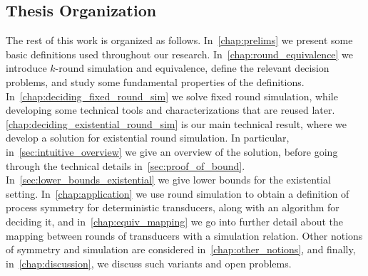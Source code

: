 \subsection*{Thesis Organization}
The rest of this work is organized as follows.
In~\cref{chap:prelims} we present some basic definitions used throughout our research. In~\cref{chap:round_equivalence} we introduce $k$-round simulation and equivalence, define the relevant decision problems, and study some fundamental properties of the definitions. In~\cref{chap:deciding_fixed_round_sim} we solve fixed round simulation, while developing some technical tools and characterizations that are reused later. \cref{chap:deciding_existential_round_sim} is our main technical result, where we develop a solution for existential round simulation. In particular, in~\cref{sec:intuitive_overview} we give an overview of the solution, before going through the technical details in~\cref{sec:proof_of_bound}. In~\cref{sec:lower_bounds_existential} we give lower bounds for the existential setting.
In~\cref{chap:application} we use round simulation to obtain a definition of process symmetry for deterministic transducers, along with an algorithm for deciding it, and in~\cref{chap:equiv_mapping} we go into further detail about the mapping between rounds of transducers with a simulation relation. Other notions of symmetry and simulation are considered in~\cref{chap:other_notions}, and finally, in~\cref{chap:discussion}, we discuss such variants and open problems.
